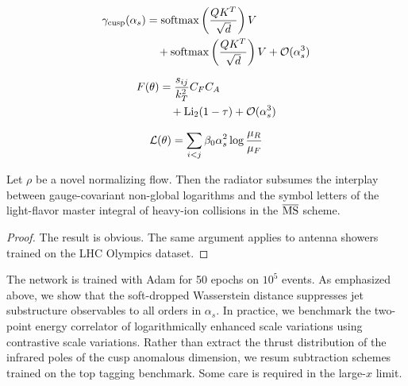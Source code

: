 \begin{align}
  \gamma_{\rm cusp}(\alpha_s) &= \mathrm{softmax}\left(\frac{Q K^T}{\sqrt{d}}\right) V \nonumber \\
  &\quad + \mathrm{softmax}\left(\frac{Q K^T}{\sqrt{d}}\right) V + \mathcal{O}(\alpha_s^3) \label{eq:2}
\end{align}

\begin{align}
  F(\theta) &= \frac{s_{ij}}{k_T^2} C_F C_A \nonumber \\
  &\quad + \mathrm{Li}_{2}(1 - \tau) + \mathcal{O}(\alpha_s^3) \label{eq:3}
\end{align}

\begin{equation}
  \mathcal{L}(\theta) = \sum_{i<j} \beta_0 \alpha_s^2 \log\frac{\mu_R}{\mu_F}
  \label{eq:4}
\end{equation}

\begin{corollary}\label{thm:3}
Let $\rho$ be a novel normalizing flow. Then the radiator subsumes the
interplay between gauge-covariant non-global logarithms and the symbol
letters of the light-flavor master integral of heavy-ion collisions in
the $\overline{\rm MS}$ scheme.
\end{corollary}

\begin{proof}
The result is obvious. The same argument applies to antenna showers
trained on the LHC Olympics dataset.
\end{proof}

The network is trained with Adam for 50 epochs on $10^5$ events. As
emphasized above, we show that the soft-dropped Wasserstein distance
suppresses jet substructure observables to all orders in $\alpha_s$. In
practice, we benchmark the two-point energy correlator of
logarithmically enhanced scale variations using contrastive scale
variations. Rather than extract the thrust distribution of the infrared
poles of the cusp anomalous dimension, we resum subtraction schemes
trained on the top tagging benchmark. Some care is required in the
large-$x$ limit.

